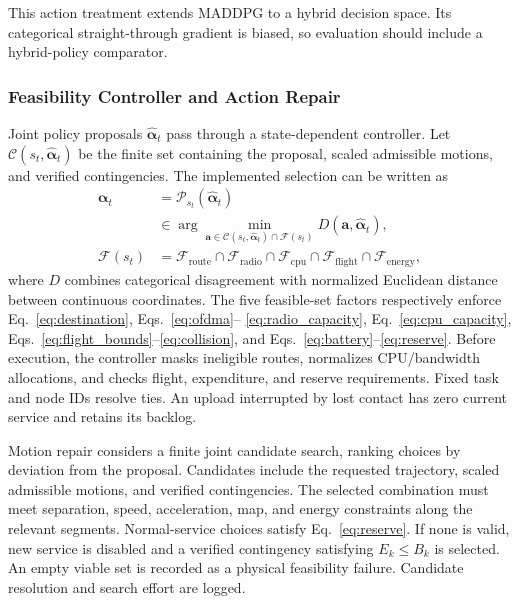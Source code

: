 \documentclass[journal]{IEEEtran}
\begin{document}
This action treatment extends MADDPG to a hybrid decision space. Its categorical straight-through gradient is biased, so evaluation should include a hybrid-policy comparator.

\subsubsection{Feasibility Controller and Action Repair}
Joint policy proposals $\widehat{\boldsymbol\alpha}_t$ pass through a state-dependent controller.  Let $\mathcal C(s_t,\widehat{\boldsymbol\alpha}_t)$ be the finite set containing the proposal, scaled admissible motions, and verified contingencies.  The implemented selection can be written as
\begin{equation}
\begin{aligned}
\boldsymbol\alpha_t
&=\mathscr P_{s_t}(\widehat{\boldsymbol\alpha}_t)\\
&\in\arg\min_{\boldsymbol a\in
\mathcal C(s_t,\widehat{\boldsymbol\alpha}_t)\cap\mathcal F(s_t)}
D(\boldsymbol a,\widehat{\boldsymbol\alpha}_t),\\
\mathcal F(s_t)&=\mathcal F_{\mathrm{route}}\cap
\mathcal F_{\mathrm{radio}}\cap\mathcal F_{\mathrm{cpu}}\cap
\mathcal F_{\mathrm{flight}}\cap\mathcal F_{\mathrm{energy}},
\end{aligned}
\label{eq:feasibility_projection}
\end{equation}
where $D$ combines categorical disagreement with normalized Euclidean
distance between continuous coordinates.  The five feasible-set factors
respectively enforce Eq.~\eqref{eq:destination}, Eqs.~\eqref{eq:ofdma}--
\eqref{eq:radio_capacity}, Eq.~\eqref{eq:cpu_capacity},
Eqs.~\eqref{eq:flight_bounds}--\eqref{eq:collision}, and
Eqs.~\eqref{eq:battery}--\eqref{eq:reserve}.  Before execution, the controller
masks ineligible routes, normalizes CPU/bandwidth allocations, and checks
flight, expenditure, and reserve requirements. Fixed task and node IDs
resolve ties. An upload interrupted by lost contact has zero current service
and retains its backlog.

Motion repair considers a finite joint candidate search, ranking choices by deviation from the proposal. Candidates include the requested trajectory, scaled admissible motions, and verified contingencies. The selected combination must meet separation, speed, acceleration, map, and energy constraints along the relevant segments. Normal-service choices satisfy Eq.~\eqref{eq:reserve}. If none is valid, new service is disabled and a verified contingency satisfying $E_k\le B_k$ is selected. An empty viable set is recorded as a physical feasibility failure. Candidate resolution and search effort are logged.
\end{document}
